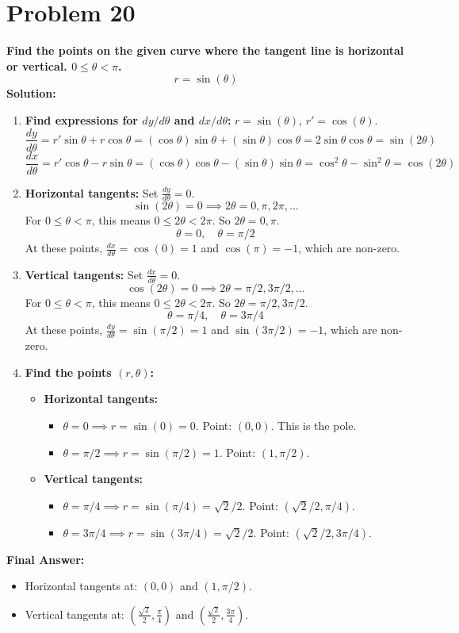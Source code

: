 \documentclass{article}
\begin{document}
\section*{Problem 20}
\textbf{Find the points on the given curve where the tangent line is horizontal or vertical. $0 \le \theta < \pi$.}
\[ r = \sin(\theta) \]
\textbf{Solution:}
\begin{enumerate}
    \item \textbf{Find expressions for $dy/d\theta$ and $dx/d\theta$:}
    $r = \sin(\theta)$, $r' = \cos(\theta)$.
    \[ \frac{dy}{d\theta} = r'\sin\theta + r\cos\theta = (\cos\theta)\sin\theta + (\sin\theta)\cos\theta = 2\sin\theta\cos\theta = \sin(2\theta) \]
    \[ \frac{dx}{d\theta} = r'\cos\theta - r\sin\theta = (\cos\theta)\cos\theta - (\sin\theta)\sin\theta = \cos^2\theta - \sin^2\theta = \cos(2\theta) \]
    \item \textbf{Horizontal tangents:} Set $\frac{dy}{d\theta} = 0$.
    \[ \sin(2\theta) = 0 \implies 2\theta = 0, \pi, 2\pi, \dots \]
    For $0 \le \theta < \pi$, this means $0 \le 2\theta < 2\pi$. So $2\theta = 0, \pi$.
    \[ \theta = 0, \quad \theta = \pi/2 \]
    At these points, $\frac{dx}{d\theta} = \cos(0)=1$ and $\cos(\pi)=-1$, which are non-zero.
    \item \textbf{Vertical tangents:} Set $\frac{dx}{d\theta} = 0$.
    \[ \cos(2\theta) = 0 \implies 2\theta = \pi/2, 3\pi/2, \dots \]
    For $0 \le \theta < \pi$, this means $0 \le 2\theta < 2\pi$. So $2\theta = \pi/2, 3\pi/2$.
    \[ \theta = \pi/4, \quad \theta = 3\pi/4 \]
    At these points, $\frac{dy}{d\theta} = \sin(\pi/2)=1$ and $\sin(3\pi/2)=-1$, which are non-zero.
    \item \textbf{Find the points $(r, \theta)$:}
    \begin{itemize}
        \item \textbf{Horizontal tangents:}
        \begin{itemize}
            \item $\theta = 0 \implies r = \sin(0) = 0$. Point: $(0, 0)$. This is the pole.
            \item $\theta = \pi/2 \implies r = \sin(\pi/2) = 1$. Point: $(1, \pi/2)$.
        \end{itemize}
        \item \textbf{Vertical tangents:}
        \begin{itemize}
            \item $\theta = \pi/4 \implies r = \sin(\pi/4) = \sqrt{2}/2$. Point: $(\sqrt{2}/2, \pi/4)$.
            \item $\theta = 3\pi/4 \implies r = \sin(3\pi/4) = \sqrt{2}/2$. Point: $(\sqrt{2}/2, 3\pi/4)$.
        \end{itemize}
    \end{itemize}
\end{enumerate}
\textbf{Final Answer:}
\begin{itemize}
    \item Horizontal tangents at: $(0, 0)$ and $(1, \pi/2)$.
    \item Vertical tangents at: $(\frac{\sqrt{2}}{2}, \frac{\pi}{4})$ and $(\frac{\sqrt{2}}{2}, \frac{3\pi}{4})$.
\end{itemize}
\end{document}
